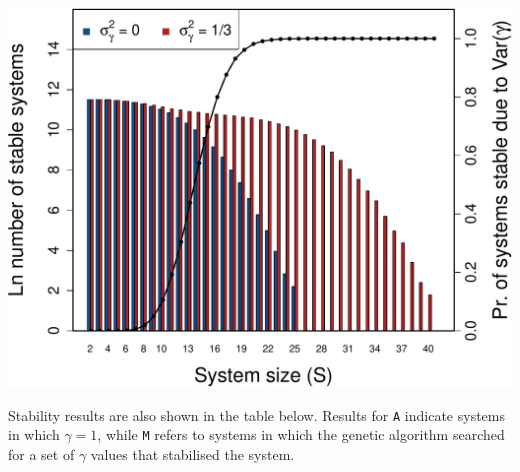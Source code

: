 \documentclass[]{article}
\begin{document}
\includegraphics{SI_files/figure-latex/unnamed-chunk-30-1.pdf}

Stability results are also shown in the table below. Results for
\texttt{A} indicate systems in which \(\gamma = 1\), while \texttt{M}
refers to systems in which the genetic algorithm searched for a set of
\(\gamma\) values that stabilised the system.
\end{document}
